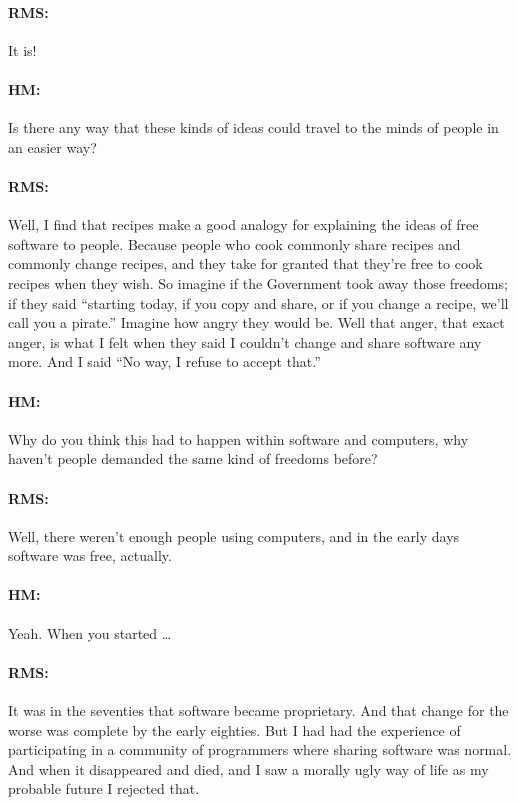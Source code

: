 \paragraph{RMS:}{It is!}

\paragraph{HM:}{Is there any way that these kinds of ideas could travel to the
minds of people in an easier way?}

\paragraph{RMS:}{Well, I f\hbox{}ind that recipes make a good analogy for
explaining the ideas of free software to people. Because people who cook
commonly share recipes and commonly change recipes, and they take for granted
that they're free to cook recipes when they wish. So imagine if the Government
took away those freedoms; if they said ``starting today, if you copy and share,
or if you change a recipe, we'll call you a pirate.'' Imagine how angry they
would be. Well that anger, that exact anger, is what I felt when they said I
couldn't change and share software any more. And I said ``No way, I refuse to
accept that.''}

\paragraph{HM:}{Why do you think this had to happen within software and
computers, why haven't people demanded the same kind of freedoms before?}

\paragraph{RMS:}{Well, there weren't enough people using computers, and in the
early days software was free, actually.}

\paragraph{HM:}{Yeah. When you started \dots}

\paragraph{RMS:}{It was in the seventies that software became proprietary. And
that change for the worse was complete by the early eighties. But I had had the
experience of participating in a community of programmers where sharing software
was normal. And when it disappeared and died, and I saw a morally ugly way of
life as my probable future I rejected that.}

